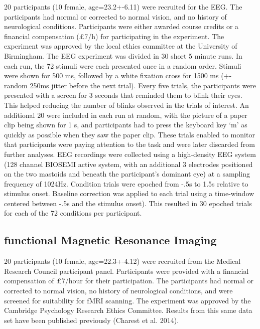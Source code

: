 \documentclass[10pt,letterpaper]{article}
\begin{document}
20 participants (10 female, age=23.2+-6.11) were recruited for the 
EEG. The participants had normal or corrected to normal vision, 
and no history of neurological conditions. Participants were either 
awarded course credits or a financial compensation (£7/h) for 
participating in the experiment. The experiment was approved by the 
local ethics committee at the University of Birmingham.
The EEG experiment was divided in 30 short 5 minute runs. In each run, 
the 72 stimuli were each presented once in a random order. Stimuli were 
shown for 500 ms, followed by a white fixation cross for 1500 ms (+- 
random 250ms jitter before the next trial). Every five trials, the 
participants were presented with a screen for 3 seconds that reminded 
them to blink their eyes. This helped reducing the number of blinks 
observed in the trials of interest. An additional 20%
were included in each run at random, with the picture of a paper clip 
being shown for 1 s, and participants had to press the keyboard key ‘m’ 
as quickly as possible when they saw the paper clip. These trials enabled 
to monitor that participants were paying attention to the task and were 
later discarded from further analyses. EEG recordings were collected 
using a high-density EEG system (128 channel BIOSEMI active system, 
with an additional 3 electrodes positioned on the two mastoids and 
beneath the participant’s dominant eye) at a sampling frequency of 
1024Hz. Condition trials were epoched from -.5s to 1.5s relative to 
stimulus onset.  Baseline correction was applied to each trial using 
a time-window centered between -.5s and the stimulus onset). This 
resulted in 30 epoched trials for each of the 72 conditions per participant.

\subsection{functional Magnetic Resonance Imaging}

20 participants (10 female, age=22.3+-4.12) were recruited from the 
Medical Research Council participant panel. Participants were provided 
with a financial compensation of £7/hour for their participation. The 
participants had normal or corrected to normal vision, no history of 
neurological conditions, and were screened for suitability for fMRI 
scanning. The experiment was approved by the Cambridge Psychology 
Research Ethics Committee. Results from this same data set have been 
published previously (Charest et al. 2014).
\end{document}
